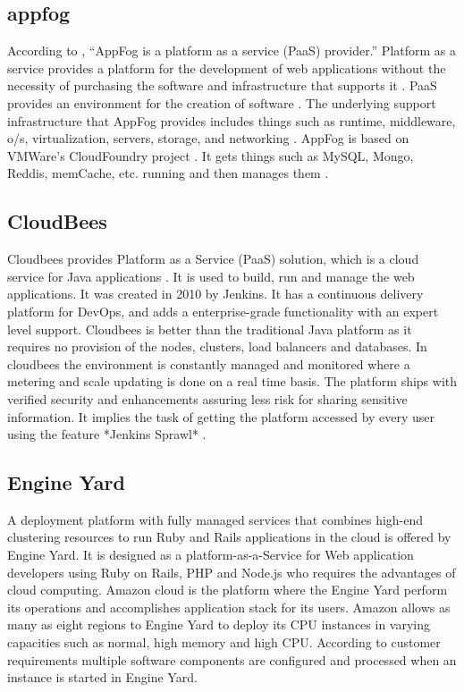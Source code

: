     
\subsection{appfog}

    According to \cite{wee}, ``AppFog is a platform as a service (PaaS)
    provider.'' Platform as a service provides a platform for the
    development of web applications without the necessity of
    purchasing the software and infrastructure that supports
    it \cite{kepes}. PaaS provides an environment for the creation of
    software \cite{kepes}. The underlying support infrastructure that AppFog
    provides includes things such as runtime, middleware, o/s,
    virtualization, servers, storage, and networking \cite{appfog}. AppFog
    is based on VMWare’s CloudFoundry project \cite{wee}. It gets things
    such as MySQL, Mongo, Reddis, memCache, etc. running and then
    manages them \cite{tweney}.
    
\subsection{CloudBees}

    Cloudbees provides Platform as a Service (PaaS) solution, which is
    a cloud service for Java applications
    \cite{www-cloudbees-wiki}. It is used to build, run and manage
    the web applications. It was created in 2010 by Jenkins. It has a
    continuous delivery platform for DevOps, and adds a
    enterprise-grade functionality with an expert level
    support. Cloudbees is better than the traditional Java platform as
    it requires no provision of the nodes, clusters, load balancers
    and databases. In cloudbees the environment is constantly managed
    and monitored where a metering and scale updating is done on a
    real time basis. The platform ships with verified security and
    enhancements assuring less risk for sharing sensitive
    information. It implies the task of getting the platform accessed
    by every user using the feature *Jenkins Sprawl*
    \cite{www-cloudbees-webpage}.

\subsection{Engine Yard}

    A deployment platform with fully managed services that combines
    high-end clustering resources to run Ruby and Rails applications
    in the cloud is offered by Engine Yard. It is designed as a
    platform-as-a-Service for Web application developers using Ruby on
    Rails, PHP and Node.js who requires the advantages of cloud
    computing. Amazon cloud is the platform where the Engine Yard
    perform its operations and accomplishes application stack for its
    users. Amazon allows as many as eight regions to Engine Yard to
    deploy its CPU instances in varying capacities such as normal,
    high memory and high CPU. According to customer requirements
    multiple software components are configured and processed when an
    instance is started in Engine Yard.
    
